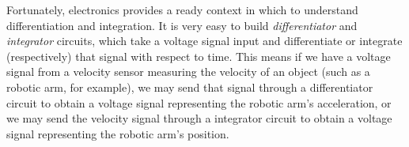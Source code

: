Fortunately, electronics provides a ready context in which to understand differentiation and integration.  It is very easy to build {\it differentiator} and {\it integrator} circuits, which take a voltage signal input and differentiate or integrate (respectively) that signal with respect to time.  This means if we have a voltage signal from a velocity sensor measuring the velocity of an object (such as a robotic arm, for example), we may send that signal through a differentiator circuit to obtain a voltage signal representing the robotic arm's acceleration, or we may send the velocity signal through a integrator circuit to obtain a voltage signal representing the robotic arm's position.

